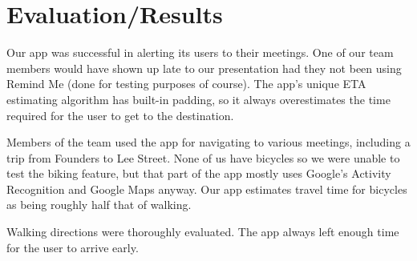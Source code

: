 \section{Evaluation/Results}
Our app was successful in alerting its users to their meetings. One of our team members would have shown up late to our presentation had they not been using Remind Me (done for testing purposes of course). The app's unique ETA estimating algorithm has built-in padding, so it always overestimates the time required for the user to get to the destination. 

Members of the team used the app for navigating to various meetings, including a trip from Founders to Lee Street. None of us have bicycles so we were unable to test the biking feature, but that part of the app mostly uses Google's Activity Recognition and Google Maps anyway. Our app estimates travel time for bicycles as being roughly half that of walking.

Walking directions were thoroughly evaluated. The app always left enough time for the user to arrive early. 

